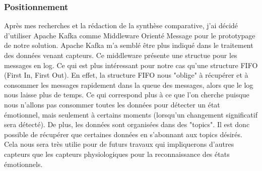 \documentclass{article}
\begin{document}
		\subsubsection{Positionnement}\label{sec:position}
			Après mes recherches et la rédaction de la synthèse comparative, j'ai décidé d'utiliser Apache Kafka comme Middleware Orienté Message pour le prototypage de notre solution.
			Apache Kafka m'a semblé être plus indiqué dans le traitement des données venant capteurs.
			Ce middleware présente une structue pour les messages en log.
			Ce qui est plus intéressant pour notre cas qu'une structure FIFO (First In, First Out).
			En effet, la structure FIFO nous "oblige" à récupérer et à consommer les messages rapidement dans la queue des messages, alors que le log nous laisse plus de temps.
			Ce qui correspond plus à ce que l'on cherche puisque nous n'allons pas consommer toutes les données pour détecter un état émotionnel, mais seulement à certains moments (lorsqu'un changement significatif sera détecté).
			De plus, les données sont organisées dans des "topics".
			Il est donc possible de récupérer que certaines données en s'abonnant aux topics désirés.
			Cela nous sera très utilie pour de futurs travaux qui impliquerons d'autres capteurs que les capteurs physiologiques pour la reconnaissance des états émotionnels.
\end{document}
